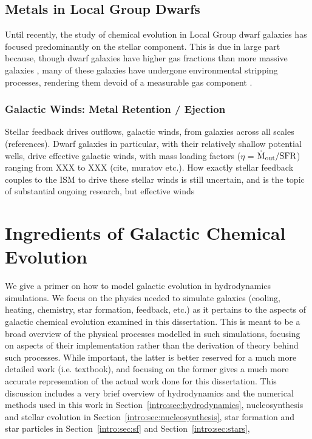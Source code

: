 \subsection{Metals in Local Group Dwarfs}

Until recently, the study of chemical evolution in Local Group dwarf galaxies has focused predominantly on the stellar component. This is due in large part because, though dwarf galaxies have higher gas fractions than more massive galaxies \citep{Geha2006}, many of these galaxies have undergone environmental stripping processes, rendering them devoid of a measurable gas component \citep{GrcevichPutman2009}. 


\subsubsection{Galactic Winds: Metal Retention / Ejection}

Stellar feedback drives outflows, galactic winds, from galaxies across all scales (references). Dwarf galaxies in particular, with their relatively shallow potential wells, drive effective galactic winds, with mass loading factors ($\eta$ = $\dot{\rm{M}}_{\rm out} / {\rm SFR}$) ranging from XXX to XXX (cite, muratov etc.). How exactly stellar feedback couples to the ISM to drive these stellar winds is still uncertain, and is the topic of substantial ongoing research, but effective winds 


\section{Ingredients of Galactic Chemical Evolution}

We give a primer on how to model galactic evolution in hydrodynamics simulations. We focus on the physics needed to simulate galaxies (cooling, heating, chemistry, star formation, feedback, etc.) as it pertains to the aspects of galactic chemical evolution examined in this dissertation. This is meant to be a broad overview of the physical processes modelled in such simulations, focusing on aspects of their implementation rather than the derivation of theory behind such processes. While important, the latter is better reserved for a much more detailed work (i.e. textbook), and focusing on the former gives a much more accurate represenation of the actual work done for this dissertation. This discussion includes a very brief overview of hydrodynamics and the numerical methods used in this work in Section~\ref{intro:sec:hydrodynamics}, nucleosynthesis and stellar evolution in Section~\ref{intro:sec:nucleosynthesis}, star formation and star particles in Section~\ref{intro:sec:sf} and Section~\ref{intro:sec:stars},

